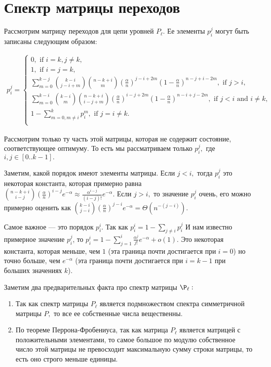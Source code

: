 \documentclass[russian]{article}
\begin{document}
\section{Спектр матрицы переходов}

Рассмотрим матрицу переходов для цепи уровней $P_\ell.$ Ее элементы $p_i^j$ могут быть записаны следующим образом:

\begin{align*}
  p_i^j = \begin{cases}
    0, \text{ if } i = k, j \ne k, \\
    1, \text{ if } i = j = k, \\
    \sum\limits_{m = 0}^{k - j} \binom{k - i}{j - i + m} \binom{n - k + i}{m} \left(\frac{\alpha}{n}\right)^{j - i + 2m} \left(1 - \frac{\alpha}{n}\right)^{n - j + i - 2m}, \text{ if } j > i, \\
      \sum\limits_{m = 0}^{k - i} \binom{k - i}{m} \binom{n - k + i}{i - j + m} \left(\frac{\alpha}{n}\right)^{i - j + 2m} \left(1 - \frac{\alpha}{n}\right)^{n - i + j - 2m}, \text{ if } j < i \text{ and } i \ne k, \\
      1 - \sum\limits_{m = 0, m \ne i}^k p_i^m, \text{ if } j = i \ne k. \\
  \end{cases}
\end{align*}

Рассмотрим только ту часть этой матрицы, которая не содержит состояние, соответствующее оптимуму. То есть мы рассматриваем только $p_i^j,$ где $i, j \in [0..k-1].$

Заметим, какой порядок имеют элементы матрицы. Если $j < i,$ тогда $p_i^j$ это некоторая константа, которая примерно равна $\binom{n - k + i}{i - j}\left(\frac{\alpha}{n}\right)^{i - j}e^{-\alpha} \approx \frac{\alpha^{i - j}}{(i - j)!} e^{-\alpha}.$ Если $j > i,$ то значение $p_i^j$ очень, его можно примерно оценить как $\binom{k - i}{j - i}\left(\frac{\alpha}{n}\right)^{j - i}e^{-\alpha} = \Theta(n^{-(j - i)}).$

Самое важное --- это порядок $p_i^i.$ Так как $p_i^i = 1 - \sum\limits_{j \ne i} p_i^j$ И нам известно примерное значение $p_i^j$, то $p_i^i = 1 - \sum\limits_{j = 1}^{i} \frac{\alpha^j}{j!}e^{-\alpha} + o(1).$  Это некоторая константа, которая меньше, чем $1$ (эта граница почти достигается при $i = 0$) но точно больше, чем $e^{-\alpha}$ (эта граница почти достигается при $i = k - 1$ при больших значениях $k$).

Заметим два предварительных факта про спектр матрицы $\P_\ell:$
\begin{enumerate}
  \item Так как спектр матрицы $P_\ell$ является подмножеством спектра симметричной матрицы $P,$ то все ее собственные числа вещественны.
  \item По теореме Перрона-Фробениуса, так как матрица $P_\ell$ является матрицей с положительными элементами, то самое большое по модулю собственное число этой матрицы не превосходит максимальную сумму строки матрицы, то есть оно строго меньше единицы.
\end{enumerate}
\end{document}
